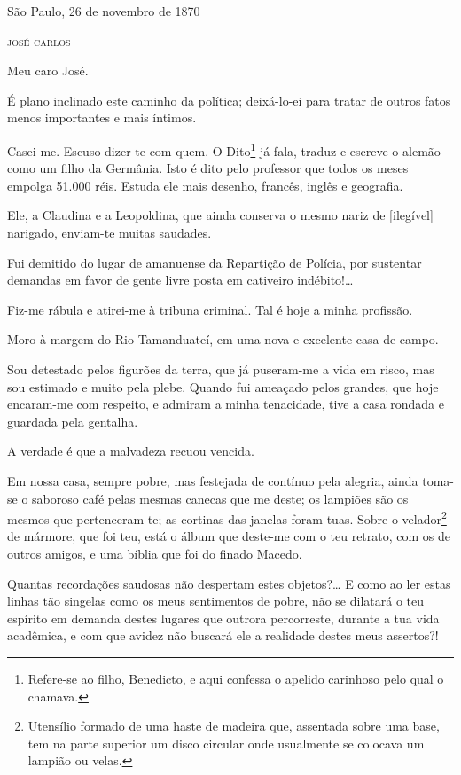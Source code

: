 \begin{flushright}
São Paulo, 26 de novembro de 1870

\textsc{josé carlos}
\end{flushright}

\asterisc{}

Meu caro José.

É plano inclinado este caminho da política; deixá-lo-ei para tratar de
outros fatos menos importantes e mais íntimos.

Casei-me. Escuso dizer-te com quem. O {Dito}\footnote{ Refere-se ao
  filho, Benedicto, e aqui confessa o apelido carinhoso pelo qual o
  chamava.} já fala, traduz e escreve o alemão como um filho da
Germânia. Isto é dito pelo professor que todos os meses empolga 51.000
réis. Estuda ele mais desenho, francês, inglês e geografia.

Ele, a Claudina e a Leopoldina, que ainda conserva o mesmo nariz de
{[}ilegível{]} narigado, enviam-te muitas saudades.

Fui demitido do lugar de amanuense da Repartição de Polícia, por
sustentar demandas em favor de gente livre posta em cativeiro
indébito!\ldots{}

Fiz-me rábula e atirei-me à tribuna criminal. Tal é hoje a minha
profissão.

Moro à margem do Rio Tamanduateí, em uma nova e excelente casa de campo.

Sou detestado pelos figurões da terra, que já puseram-me a vida em
risco, mas sou estimado e muito pela plebe. Quando fui ameaçado pelos
grandes, que hoje encaram-me com respeito, e admiram a minha tenacidade,
tive a casa rondada e guardada pela gentalha.

A verdade é que a malvadeza recuou vencida.

Em nossa casa, sempre pobre, mas festejada de contínuo pela alegria,
ainda toma-se o saboroso café pelas mesmas canecas que me deste; os
lampiões são os mesmos que pertenceram-te; as cortinas das janelas foram
tuas. Sobre o velador\footnote{ Utensílio formado de uma haste de
  madeira que, assentada sobre uma base, tem na parte superior um disco
  circular onde usualmente se colocava um lampião ou velas.} de mármore,
que foi teu, está o álbum que deste-me com o teu retrato, com os de
outros amigos, e uma bíblia que foi do finado Macedo.

Quantas recordações saudosas não despertam estes objetos?\ldots{} E como ao
ler estas linhas tão singelas como os meus sentimentos de pobre, não se
dilatará o teu espírito em demanda destes lugares que outrora
percorreste, durante a tua vida acadêmica, e com que avidez não buscará
ele a realidade destes meus assertos?!

